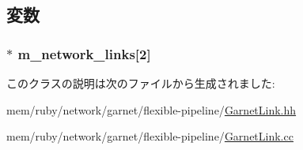 \subsection{変数}
\hypertarget{classGarnetIntLink_a94c05b942b28036b0b5ae2a8c639f068}{
\subsubsection[{m\_\-network\_\-links}]{$\ast$ {\bf m\_\-network\_\-links}\mbox{[}2\mbox{]}}}
\label{classGarnetIntLink_a94c05b942b28036b0b5ae2a8c639f068}


このクラスの説明は次のファイルから生成されました:\begin{DoxyCompactItemize}
\item 
mem/ruby/network/garnet/flexible-\/pipeline/\hyperlink{GarnetLink_8hh}{GarnetLink.hh}\item 
mem/ruby/network/garnet/flexible-\/pipeline/\hyperlink{GarnetLink_8cc}{GarnetLink.cc}\end{DoxyCompactItemize}
